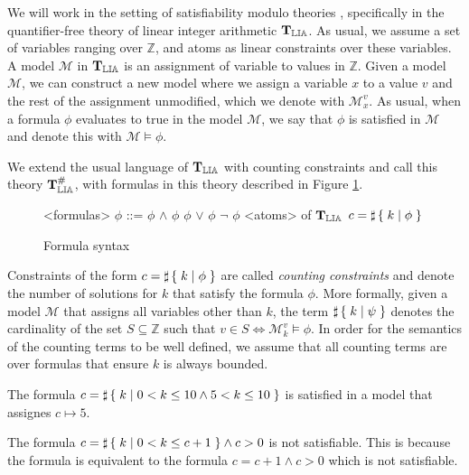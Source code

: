 
We will work in the setting of satisfiability modulo theories
\cite{smt}, specifically in the quantifier-free theory of linear
integer arithmetic $\operatorname{\mathbf{T}_\mathbb{LIA}}$. As usual, we assume a set of variables
ranging over $\mathbb{Z}$, and atoms as linear constraints over these
variables. A model $\mathcal{M}$ in $\operatorname{\mathbf{T}_\mathbb{LIA}}$ is an assignment of
variable to values in $\mathbb{Z}$. Given a model $\mathcal{M}$, we
can construct a new model where we assign a variable $x$ to a value
$v$ and the rest of the assignment unmodified, which we denote with
$\mathcal{M}^v_x$. As usual, when a formula $\phi$ evaluates to true
in the model $\mathcal{M}$, we say that $\phi$ is satisfied in
$\mathcal{M}$ and denote this with $\mathcal{M} \vDash \phi$.

We extend the usual language of $\operatorname{\mathbf{T}_\mathbb{LIA}}$ with counting constraints and
call this theory $\operatorname{\mathbf{T}^\#_\mathbb{LIA}}$, with formulas in this theory described in
Figure \ref{formula}.

\begin{figure}[h]
\begin{grammar}
<formulas> $\phi$ ::= $\phi$ $\land$ $\phi$
\alt $\phi$ $\lor$ $\phi$
\alt $\lnot$ $\phi$
\alt <atoms> of $\operatorname{\mathbf{T}_\mathbb{LIA}}$
\alt $c = \sharp\left\lbrace\;k\;|\;\phi\;\right\rbrace$
\end{grammar}

\caption{Formula syntax}
\label{formula}
\end{figure}

Constraints of the form $c = \sharp\left\lbrace\;k\;|\;\phi\;\right\rbrace$ are called
\emph{counting constraints} and denote the number of solutions for $k$
that satisfy the formula $\phi$. More formally, given a model $\mathcal{M}$ that
assigns all variables other than $k$, the term $\sharp\left\lbrace\;k\;|\;\psi\;\right\rbrace$
denotes the cardinality of the set $S \subseteq \mathbb{Z}$ such that
$v \in S \iff \mathcal{M}^v_k \vDash \phi$. In order for the semantics
of the counting terms to be well defined, we assume that all counting
terms are over formulas that ensure $k$ is always bounded.

\begin{example}
The formula $c = \sharp\left\lbrace\;k\;|\;0 < k \le 10 \land 5 < k \le 10\;\right\rbrace$ is
satisfied in a model that assignes $c \mapsto 5$.
\end{example}

\begin{example}
The formula $c = \sharp\left\lbrace\;k\;|\;0 < k \le c + 1\;\right\rbrace \land c > 0$ is
not satisfiable. This is because the formula is equivalent to the
formula $c = c+1 \land c >0$ which is not satisfiable.
\end{example}

